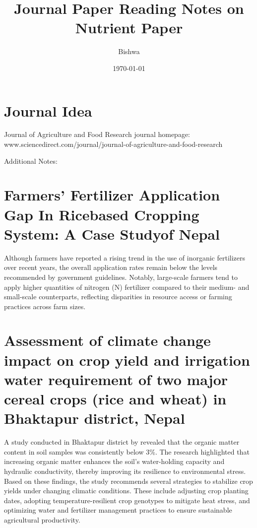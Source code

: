\documentclass[a4paper,12pt]{article}
\title{Journal Paper Reading Notes on Nutrient Paper}
\author{Bishwa}
\date{\today}
\begin{document}
\maketitle

\section{Journal Idea}
Journal of Agriculture and Food Research  journal homepage: www.sciencedirect.com/journal/journal-of-agriculture-and-food-research


Additional Notes:


\section{Farmers’ Fertilizer Application Gap In Ricebased Cropping System: A Case Studyof Nepal}
\parencite{baralFarmersFertilizerApplication2020}
Although farmers have reported a rising trend in the use of inorganic fertilizers over recent years, the overall application rates remain below the levels recommended by government guidelines. Notably, large-scale farmers tend to apply higher quantities of nitrogen (N) fertilizer compared to their medium- and small-scale counterparts, reflecting disparities in resource access or farming practices across farm sizes.


\section{Assessment of climate change impact on crop yield and irrigation water requirement of two major cereal crops (rice and wheat) in Bhaktapur district, Nepal}

\parencite{shresthaAssessmentClimateChange2017}

A study conducted in Bhaktapur district by \parencite{shresthaAssessmentClimateChange2017} revealed that the organic matter content in soil samples was consistently below 3\%. The research highlighted that increasing organic matter enhances the soil’s water-holding capacity and hydraulic conductivity, thereby improving its resilience to environmental stress.
Based on these findings, the study recommends several strategies to stabilize crop yields under changing climatic conditions. These include adjusting crop planting dates, adopting temperature-resilient crop genotypes to mitigate heat stress, and optimizing water and fertilizer management practices to ensure sustainable agricultural productivity.
\end{document}
